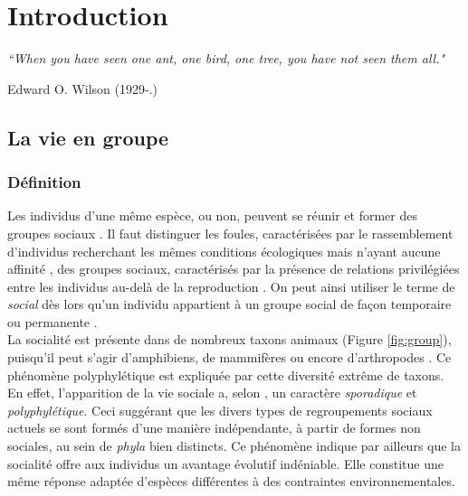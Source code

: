 
\chapter*{Introduction} %
\label{Introduction} %


\textit{``When you have seen one ant, one bird, one tree, you have not seen them all."}

\begin{flushright}
Edward O. Wilson (1929-.)
\end{flushright}


\cleardoublepage
\section{La vie en groupe}
\label{sec:vie}


	\subsection{Définition}
    \label{subsec:definitionvie}
Les individus d'une même espèce, ou non, peuvent se réunir et former des groupes sociaux \cite{campan_ethologie._2002}. Il faut distinguer les foules, caractérisées par le rassemblement d'individus recherchant les mêmes conditions écologiques mais n'ayant aucune affinité \cite{campan_ethologie._2002}, des groupes sociaux, caractérisés par la présence de relations privilégiées entre les individus au-delà de la reproduction \cite{campan_ethologie._2002}. On peut ainsi utiliser le terme de \textit{social} dès lors qu'un individu appartient à un groupe social de façon temporaire ou permanente \citep{campan_ethologie._2002, aron_les_2009}.\\
La socialité est présente dans de nombreux taxons animaux (Figure \ref{fig:group}), puisqu'il peut s'agir d'amphibiens, de mammifères ou encore d'arthropodes \citep{campan_ethologie._2002, aron_les_2009}. Ce phénomène polyphylétique est expliquée par cette diversité extrême de taxons. En effet, l'apparition de la vie sociale a, selon \citet{le_masne_classification_1952}, un caractère \textit{sporadique} et \textit{polyphylétique}. Ceci suggérant que les divers types de regroupements sociaux actuels se sont formés d'une manière indépendante, à partir de formes non sociales, au sein de \textit{phyla} bien distincts. Ce phénomène indique par ailleurs que la socialité offre aux individus un avantage évolutif indéniable. Elle constitue une même réponse adaptée d'espèces différentes à des contraintes environnementales.

